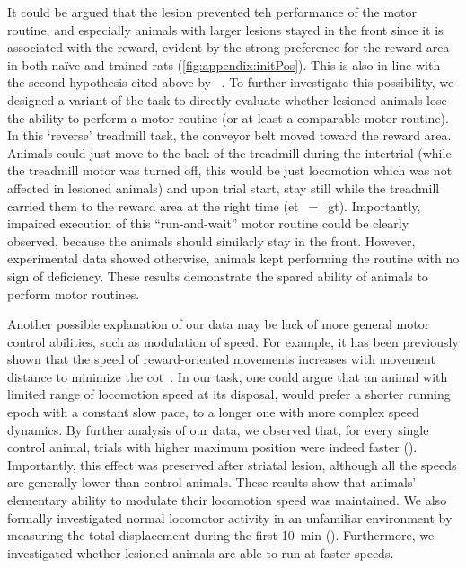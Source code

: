 It could be argued that the lesion prevented teh performance of the motor routine, and especially animals with larger lesions stayed in the front since it is associated with the reward, evident by the strong preference for the reward area in both na\"{i}ve and trained rats (\autoref{fig:appendix:initPos}).
This is also in line with the second hypothesis cited above by \citeauthor{Dhawale2019}~\cite{Dhawale2019}.
To further investigate this possibility, we designed a variant of the task to directly evaluate whether lesioned animals lose the ability to perform a motor routine (or at least a comparable motor routine).
In this `reverse' treadmill task, the conveyor belt moved toward the reward area.
Animals could just move to the back of the treadmill during the intertrial (while the treadmill motor was turned off, this would be just locomotion which was not affected in lesioned animals) and upon trial start, stay still while the treadmill carried them to the reward area at the right time (\gls{et}~$=$~\gls{gt}).
Importantly, impaired execution of this ``run-and-wait'' motor routine could be clearly observed, because the animals should similarly stay in the front.
However, experimental data showed otherwise, animals kept performing the routine with no sign of deficiency.
These results demonstrate the spared ability of animals to perform motor routines.
\par
Another possible explanation of our data may be lack of more general motor control abilities, such as modulation of speed.
For example, it has been previously shown that the speed of reward-oriented movements increases with movement distance to minimize the \gls{cot}~\cite{Shadmehr2010Jneurosci}.
In our task, one could argue that an animal with limited range of locomotion speed at its disposal, would prefer a shorter running epoch with a constant slow pace, to a longer one with more complex speed dynamics.
By further analysis of our data, we observed that, for every single control animal, trials with higher maximum position were indeed faster ().
Importantly, this effect was preserved after striatal lesion, although all the speeds are generally lower than control animals.
These results show that animals' elementary ability to modulate their locomotion speed was maintained.
We also formally investigated normal locomotor activity in an unfamiliar environment by measuring the total displacement during the first 10~min ().
Furthermore, we investigated whether lesioned animals are able to run at faster speeds.
